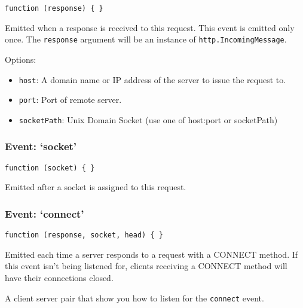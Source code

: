 \texttt{function (response) \{ \}}

Emitted when a response is received to this request. This event is
emitted only once. The \texttt{response} argument will be an instance of
\texttt{http.IncomingMessage}.

Options:

\begin{itemize}
\item
  \texttt{host}: A domain name or IP address of the server to issue the
  request to.
\item
  \texttt{port}: Port of remote server.
\item
  \texttt{socketPath}: Unix Domain Socket (use one of host:port or
  socketPath)
\end{itemize}

\subsubsection{Event: `socket'}

\texttt{function (socket) \{ \}}

Emitted after a socket is assigned to this request.

\subsubsection{Event: `connect'}

\texttt{function (response, socket, head) \{ \}}

Emitted each time a server responds to a request with a CONNECT method.
If this event isn't being listened for, clients receiving a CONNECT
method will have their connections closed.

A client server pair that show you how to listen for the
\texttt{connect} event.


